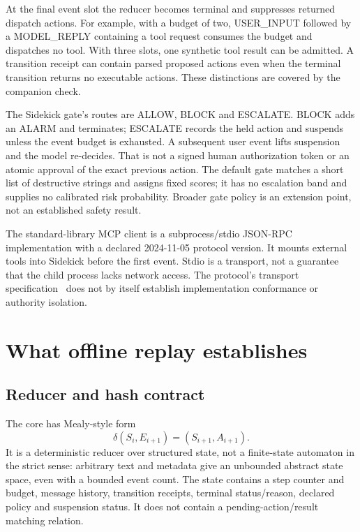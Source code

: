 \documentclass[10pt,twocolumn,letterpaper]{article}
\begin{document}
At the final event slot the reducer becomes terminal and suppresses returned dispatch actions. For example, with a budget of two, USER\_INPUT followed by a MODEL\_REPLY containing a tool request consumes the budget and dispatches no tool. With three slots, one synthetic tool result can be admitted. A transition receipt can contain parsed proposed actions even when the terminal transition returns no executable actions. These distinctions are covered by the companion check.

The Sidekick gate's routes are ALLOW, BLOCK and ESCALATE. BLOCK adds an ALARM and terminates; ESCALATE records the held action and suspends unless the event budget is exhausted. A subsequent user event lifts suspension and the model re-decides. That is not a signed human authorization token or an atomic approval of the exact previous action. The default gate matches a short list of destructive strings and assigns fixed scores; it has no escalation band and supplies no calibrated risk probability. Broader gate policy is an extension point, not an established safety result.

The standard-library MCP client is a subprocess/stdio JSON-RPC implementation with a declared 2024-11-05 protocol version. It mounts external tools into Sidekick before the first event. Stdio is a transport, not a guarantee that the child process lacks network access. The protocol's transport specification~\cite{mcptransport} does not by itself establish implementation conformance or authority isolation.

\section{What offline replay establishes}
\subsection{Reducer and hash contract}
The core has Mealy-style form
\[
  \delta(S_i,E_{i+1})=(S_{i+1},A_{i+1}).
\]
It is a deterministic reducer over structured state, not a finite-state automaton in the strict sense: arbitrary text and metadata give an unbounded abstract state space, even with a bounded event count. The state contains a step counter and budget, message history, transition receipts, terminal status/reason, declared policy and suspension status. It does not contain a pending-action/result matching relation.
\end{document}
